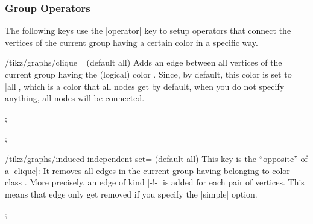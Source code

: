 %
%


\subsubsection{Group Operators}

The following keys use the |operator| key to setup operators that connect the
vertices of the current group having a certain color in a specific way.

\begin{key}{/tikz/graphs/clique= (default all)}
    Adds an edge between all vertices of the current group having the (logical)
    color . Since, by default, this color is set to |all|, which is
    a color that all nodes get by default, when you do not specify anything,
    all nodes will be connected.
\begin{codeexample}[preamble={\usetikzlibrary{graphs}}]
\tikz {};
\end{codeexample}
\begin{codeexample}[preamble={\usetikzlibrary{graphs}}]
\tikz {};
\end{codeexample}
\end{key}

\begin{key}{/tikz/graphs/induced independent set= (default all)}
    This key is the ``opposite'' of a |clique|: It removes all edges in the
    current group having belonging to color class . More precisely,
    an edge of kind |-!-| is added for each pair of vertices. This means that
    edge only get removed if you specify the |simple| option.
\begin{codeexample}[preamble={\usetikzlibrary{graphs.standard}}]
\tikz {};
\end{codeexample}
\end{key}

